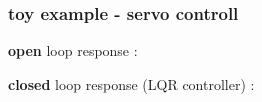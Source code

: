 \documentclass{beamer}
\begin{document}
\begin{frame}
  
  \frametitle{\bf toy example - servo controll}

  \raggedright{{\bf open} loop response :}\\
  
  \raggedright{{\bf closed} loop response (LQR controller) :}\\

\end{frame}
\end{document}
